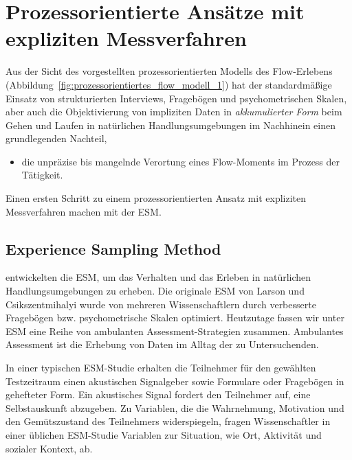 

\section{Prozessorientierte Ansätze mit expliziten Messverfahren} 

\label{sec:prozessorientierte_ansatze_mit_expliziten_messverfahren}

Aus der Sicht des vorgestellten prozessorientierten Modells des Flow-Erlebens (Abbildung~\ref{fig:prozessorientiertes_flow_modell_1}) hat der standardmäßige Einsatz von strukturierten Interviews, Fragebögen und psychometrischen Skalen, aber auch die Objektivierung von impliziten Daten in \emph{akkumulierter Form} beim Gehen und Laufen in natürlichen Handlungsumgebungen im Nachhinein einen grundlegenden Nachteil,
\begin{itemize}
	\item die unpräzise bis mangelnde Verortung eines Flow-Moments im Prozess der Tätigkeit. 
\end{itemize}

Einen ersten Schritt zu einem prozessorientierten Ansatz mit expliziten Messverfahren machen \citet{Larson1983} mit der \ac{ESM}.

\subsection{Experience Sampling Method} 

\label{sub:experience_sampling_method}

\citet{Larson1983} entwickelten die \ac{ESM}, um das Verhalten und das Erleben in natürlichen Handlungsumgebungen zu erheben. Die originale \ac{ESM} von Larson und Csikszentmihalyi wurde von mehreren Wissenschaftlern \citep[z.~B.][]{Schallberger2001, Rheinberg2003} durch verbesserte Fragebögen bzw. psychometrische Skalen optimiert. Heutzutage fassen wir unter \ac{ESM} eine Reihe von ambulanten Assessment-Strategien zusammen. Ambulantes Assessment ist die Erhebung von Daten im Alltag der zu Untersuchenden.

In einer typischen \ac{ESM}-Studie erhalten die Teilnehmer für den gewählten Testzeitraum einen akustischen Signalgeber sowie Formulare oder Fragebögen in gehefteter Form. Ein akustisches Signal fordert den Teilnehmer auf, eine Selbstauskunft abzugeben. Zu Variablen, die die Wahrnehmung, Motivation und den Gemütszustand des Teilnehmers widerspiegeln, fragen Wissenschaftler in einer üblichen \ac{ESM}-Studie Variablen zur Situation, wie Ort, Aktivität und sozialer Kontext, ab. 

